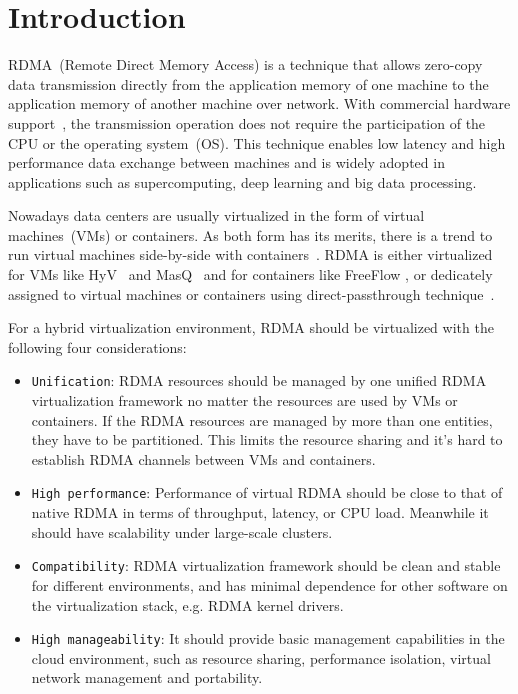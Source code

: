 \section{Introduction}
RDMA~(Remote Direct Memory Access) is a technique that allows zero-copy data transmission directly from the application memory of one machine to the application memory of another machine over network. With commercial hardware support~\cite{roce, iwarp, infiniband}, the transmission operation does not require the participation of the CPU or the operating system~(OS). This technique enables low latency and high performance data exchange between machines and is widely adopted in applications such as supercomputing, deep learning and big data processing.

Nowadays data centers are usually virtualized in the form of virtual machines~(VMs) or containers. As both form has its merits, there is a trend to run virtual machines side-by-side with containers~\cite{rethinkingvirtualization}. RDMA is either virtualized for VMs like HyV~\cite{pfefferle2015hybrid} and MasQ~\cite{he2020masq} and for containers like FreeFlow \cite{kim2019freeflow}, or dedicately assigned to virtual machines or containers using direct-passthrough technique~\cite{sr-iov}.

For a hybrid virtualization environment, RDMA should be virtualized with the following four considerations:

\begin{itemize}
	\item {\verb|Unification|}: RDMA resources should be managed by one unified RDMA virtualization framework no matter the resources are used by VMs or containers. If the RDMA resources are managed by more than one entities, they have to be partitioned. This limits the resource sharing and it's hard to establish RDMA channels between VMs and containers.
	\item {\verb|High performance|}: Performance of virtual RDMA should be close to that of native RDMA in terms of throughput, latency, or CPU load. Meanwhile it should have scalability under large-scale clusters.
	\item {\verb|Compatibility|}: RDMA virtualization framework should be clean and stable for different environments, and has minimal dependence for other software on the virtualization stack, e.g. RDMA kernel drivers.
	\item {\verb|High manageability|}: It should provide basic management capabilities in the cloud environment, such as resource sharing, performance isolation, virtual network management and portability.
\end{itemize}

